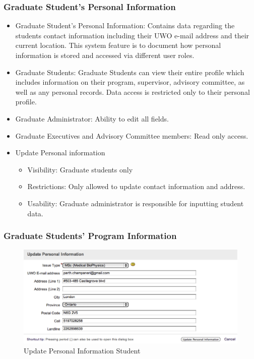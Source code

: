 \documentclass{journal}
\begin{document}
\subsubsection{Graduate Student's Personal Information}
\begin{itemize}
\item Graduate Student's Personal Information:
Contains data regarding the students contact information including their UWO e-mail address and their current location. This system feature is to document how personal information is stored and accessed via different user roles. 
\item Graduate Students: Graduate Students can view their entire profile which includes information on their program, supervisor, advisory committee, as well as any personal records. Data access is restricted only to their personal profile.
\item Graduate Administrator: Ability to edit all fields.
\item Graduate Executives and Advisory Committee members: Read only access.
\item Update Personal information
\begin{itemize}
\item Visibility: Graduate students only
\item Restrictions: Only allowed to update contact information and address. 
\item Usability: Graduate administrator is responsible for inputting student data.
\end{itemize}
\end{itemize}
\subsubsection{Graduate Students’ Program Information}

\begin{figure}[htp]
\centering
\includegraphics[scale=1]{diagrams/HTMLTemplating/UpdatePersonalInfoStudent.png}
\caption{Update Personal Information Student}
\label{fig:UpdatePIS}
\end{figure}
\end{document}
